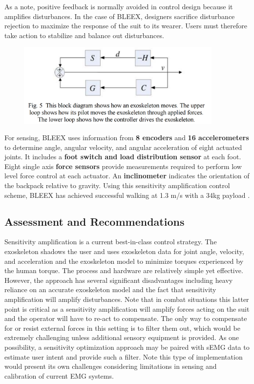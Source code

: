 \begin{refsection}
As a note, positive feedback is normally avoided in control design because it amplifies disturbances.  In the case of BLEEX, designers sacrifice disturbance rejection to maximize the response of the suit to its wearer.  Users must therefore take action to stabilize and balance out disturbances.

\begin{figure}[ht]
  \centering
  \includegraphics[width=4.0in]{exos/figs/bleex_control_diag_3.png}
\end{figure}

For sensing, BLEEX uses information from \textbf{8 encoders} and \textbf{16 accelerometers} to determine angle, angular velocity, and angular acceleration of eight actuated joints. It includes a \textbf{foot switch and load distribution sensor} at each foot. Eight single axis \textbf{force sensors} provide measurements required to perform low level force control at each actuator. An \textbf{inclinometer} indicates the orientation of the backpack relative to gravity. Using this sensitivity amplification control scheme, BLEEX has achieved successful walking at 1.3 m/s with a 34kg payload \cite{sesitivityAmpPaper2005}.

\subsection{Assessment and Recommendations}

Sensitivity amplification is a current best-in-class control strategy.  The exoskeleton shadows the user and uses exoskeleton data for joint angle, velocity, and acceleration and the exoskeleton model to minimize torques experienced by the human torque.  The process and hardware are relatively simple yet effective.   However, the approach has several significant disadvantages including heavy reliance on an accurate exoskeleton model and the fact that sensitivity amplification will amplify disturbances.  Note that in combat situations this latter point is critical as a sensitivity amplification will amplify forces acting on the suit and the operator will have to re-act to compensate.  The only way to compensate for or resist external forces in this setting is to filter them out, which would be extremely challenging unless additional sensory equipment is provided.  As one possibility, a sensitivity optimization approach may be paired with sEMG data to estimate user intent and provide such a filter.  Note this type of implementation would present its own challenges considering limitations in sensing and calibration of current EMG systems. 


\end{refsection}
